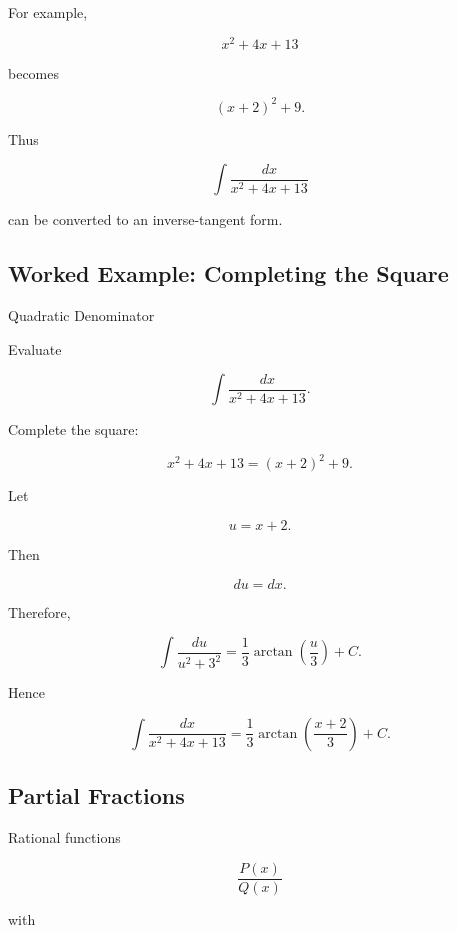 For example,

\[
x^2+4x+13
\]

becomes

\[
\boxed{
(x+2)^2+9.
}
\]

Thus

\[
\int
\frac{
dx
}{
x^2+4x+13
}
\]

can be converted to an inverse-tangent form.

\subsection{Worked Example: Completing the Square}
\label{subsec:worked-complete-square-integral}

\begin{workedexamplebox}{Quadratic Denominator}

Evaluate

\[
\int
\frac{
dx
}{
x^2+4x+13
}.
\]

Complete the square:

\[
x^2+4x+13
=
(x+2)^2+9.
\]

Let

\[
u=x+2.
\]

Then

\[
du=dx.
\]

Therefore,

\[
\int
\frac{
du
}{
u^2+3^2
}
=
\frac13
\arctan
\left(
\frac{u}{3}
\right)
+
C.
\]

Hence

\begin{answerbox}
\[
\boxed{
\int
\frac{
dx
}{
x^2+4x+13
}
=
\frac13
\arctan
\left(
\frac{x+2}{3}
\right)
+
C.
}
\]
\end{answerbox}

\end{workedexamplebox}

\subsection{Partial Fractions}
\label{subsec:partial-fractions-integral-reference}

Rational functions

\[
\frac{P(x)}{Q(x)}
\]

with

